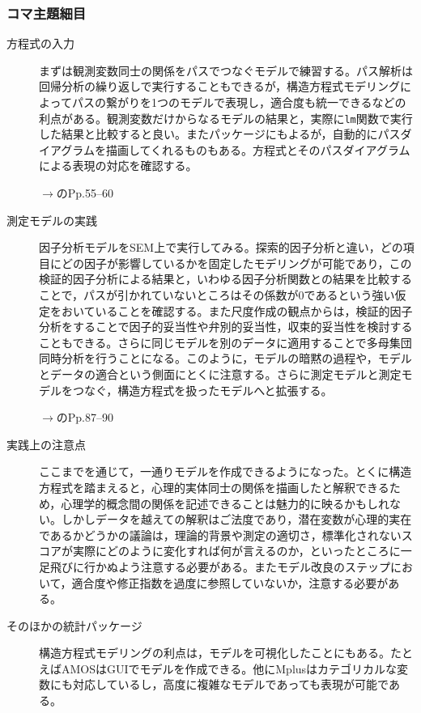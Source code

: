 \subsubsection{コマ主題細目}
\begin{description}
	\item[方程式の入力] まずは観測変数同士の関係をパスでつなぐモデルで練習する。パス解析は回帰分析の繰り返しで実行することもできるが，構造方程式モデリングによってパスの繋がりを1つのモデルで表現し，適合度も統一できるなどの利点がある。観測変数だけからなるモデルの結果と，実際に\texttt{lm}関数で実行した結果と比較すると良い。またパッケージにもよるが，自動的にパスダイアグラムを描画してくれるものもある。方程式とそのパスダイアグラムによる表現の対応を確認する。

	      \begin{flushright}
		      $\to$\textcite{Kosugi2014Mplus}のPp.55--60
	      \end{flushright}

	\item[測定モデルの実践] 因子分析モデルをSEM上で実行してみる。探索的因子分析と違い，どの項目にどの因子が影響しているかを固定したモデリングが可能であり，この検証的因子分析による結果と，いわゆる因子分析関数との結果を比較することで，パスが引かれていないところはその係数が$0$であるという強い仮定をおいていることを確認する。また尺度作成の観点からは，検証的因子分析をすることで因子的妥当性や弁別的妥当性，収束的妥当性を検討することもできる。さらに同じモデルを別のデータに適用することで多母集団同時分析を行うことになる。このように，モデルの暗黙の過程や，モデルとデータの適合という側面にとくに注意する。さらに測定モデルと測定モデルをつなぐ，構造方程式を扱ったモデルへと拡張する。

	      \begin{flushright}
		      $\to$\textcite{Kosugi2014Mplus}のPp.87--90
	      \end{flushright}

	\item[実践上の注意点] ここまでを通じて，一通りモデルを作成できるようになった。とくに構造方程式を踏まえると，心理的実体同士の関係を描画したと解釈できるため，心理学的概念間の関係を記述できることは魅力的に映るかもしれない。しかしデータを越えての解釈はご法度であり，潜在変数が心理的実在であるかどうかの議論は，理論的背景や測定の適切さ，標準化されないスコアが実際にどのように変化すれば何が言えるのか，といったところに一足飛びに行かぬよう注意する必要がある。またモデル改良のステップにおいて，適合度や修正指数を過度に参照していないか，注意する必要がある。

	\item[そのほかの統計パッケージ] 構造方程式モデリングの利点は，モデルを可視化したことにもある。たとえばAMOSはGUIでモデルを作成できる。他にMplusはカテゴリカルな変数にも対応しているし，高度に複雑なモデルであっても表現が可能である。
\end{description}
